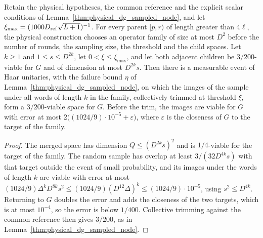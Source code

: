 \begin{lemma}
    \label{lem:physical_dg_sampled_node_power}
    \leanok
    Retain the physical hypotheses, the common reference and the explicit
    scalar conditions of Lemma~\ref{thm:physical_dg_sampled_node}, and let
    $\xi_{\max}=(1000D_{\rm ref}\sqrt{L+1})^{-1}$. For every parent $[p,r)$
    of length greater than $4\ell$, the physical construction chooses an
    operator family of size at most $D^2$ before the number of rounds, the
    sampling size, the threshold and the child spaces. Let $k\ge1$ and
    $1\le s\le D^{2k}$, let $0<\xi\le\xi_{\max}$, and let both adjacent
    children be $3/200$-viable for $G$ and of dimension at most $D^{2k}s$.
    Then there is a measurable event of Haar unitaries, with the failure
    bound $\eta$ of Lemma~\ref{thm:physical_dg_sampled_node}, on which the
    images of the sample under all words of length $k$ in the family,
    collectively trimmed at threshold $\xi$, form a $3/200$-viable space for
    $G$. Before the trim, the images are viable for $G$ with error at most
    $2\bigl((1024/9)\cdot10^{-5}+\varepsilon\bigr)$, where $\varepsilon$ is the
    closeness of $G$ to the target of the family.
\end{lemma}
\begin{proof}\leanok
    The merged space has dimension $Q\le(D^{2k}s)^2$ and is $1/4$-viable for
    the target of the family. The random sample has overlap at least
    $3/(32D^{4k}s)$ with that target outside the event of small probability,
    and its images under the words of length $k$ are viable with error at most
    $(1024/9)\Delta^kD^{8k}s^2\le(1024/9)(D^{12}\Delta)^k\le(1024/9)\cdot10^{-5}$,
    using $s^2\le D^{4k}$. Returning to $G$ doubles the error and adds the
    closeness of the two targets, which is at most $10^{-4}$, so the error is
    below $1/400$. Collective trimming against the common reference then gives
    $3/200$, as in Lemma~\ref{thm:physical_dg_sampled_node}.
\end{proof}

